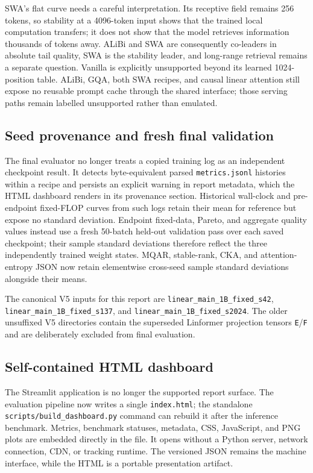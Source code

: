 \documentclass[11pt,a4paper]{article}
\theoremstyle{definition}
\theoremstyle{plain}
\begin{document}
SWA's flat curve needs a careful interpretation.  Its receptive field remains
256 tokens, so stability at a 4096-token input shows that the trained local
computation transfers; it does not show that the model retrieves information
thousands of tokens away.  ALiBi and SWA are consequently co-leaders in absolute
tail quality, SWA is the stability leader, and long-range retrieval remains a
separate question.  Vanilla is explicitly unsupported beyond its learned
1024-position table.  ALiBi, GQA, both SWA recipes, and causal linear attention
still expose no reusable prompt cache through the shared interface; those serving
paths remain labelled unsupported rather than emulated.


\subsection{Seed provenance and fresh final validation}

The final evaluator no longer treats a copied training log as an independent
checkpoint result.  It detects byte-equivalent parsed \texttt{metrics.jsonl}
histories within a recipe and persists an explicit warning in report metadata,
which the HTML dashboard renders in its provenance section.  Historical wall-clock
and pre-endpoint fixed-FLOP curves from such logs retain their mean for reference
but expose no standard deviation.  Endpoint fixed-data, Pareto, and aggregate
quality values instead use a fresh 50-batch held-out validation pass over each
saved checkpoint;
their sample standard deviations therefore reflect the three independently
trained weight states.  MQAR, stable-rank, CKA, and attention-entropy JSON now
retain elementwise cross-seed sample standard deviations alongside their means.

The canonical V5 inputs for this report are
\texttt{linear\_main\_1B\_fixed\_s42},
\texttt{linear\_main\_1B\_fixed\_s137}, and
\texttt{linear\_main\_1B\_fixed\_s2024}.  The older unsuffixed V5
directories contain the superseded Linformer projection tensors
\texttt{E}/\texttt{F} and are deliberately excluded from final evaluation.

\subsection{Self-contained HTML dashboard}

The Streamlit application is no longer the supported report surface.  The
evaluation pipeline now writes a single \texttt{index.html}; the standalone
\texttt{scripts/build\_dashboard.py} command can rebuild it after the inference
benchmark.  Metrics, benchmark statuses, metadata, CSS, JavaScript, and PNG plots
are embedded directly in the file.  It opens without a Python server, network
connection, CDN, or tracking runtime.  The versioned JSON remains the machine
interface, while the HTML is a portable presentation artifact.
\end{document}
